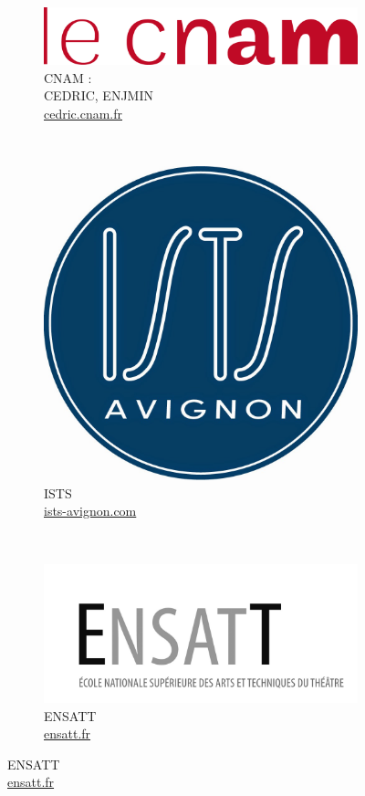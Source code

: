 \documentclass{beamer}
\begin{document}
\begin{frame}
\begin{figure}[htbp]
    
    \begin{subfigure}[b]{0.30\textwidth} 
        \centering
        \includegraphics[scale=0.25]{images/cnam.png}
        \caption[]{CNAM : \\ CEDRIC, ENJMIN\\ \url{cedric.cnam.fr}}
    \end{subfigure}
    ~
    \begin{subfigure}[b]{0.30\textwidth} 
        \centering
        \includegraphics[scale=0.05]{images/ists.jpg}
        \caption[]{ISTS\\ \url{ists-avignon.com}}
    \end{subfigure}
    ~
    \begin{subfigure}[b]{0.30\textwidth} 
        \centering
        \includegraphics[scale=0.23]{images/ensatt.jpg}
        \caption[]{ENSATT\\ \url{ensatt.fr}}
    \end{subfigure}    
\end{figure} 
    

\end{frame}
\end{document}
